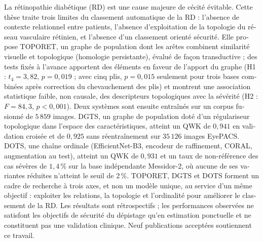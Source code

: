 \documentclass[11pt,a4paper]{article}
\newcommand{\sect}[1]{\par\vspace{5pt}{\color{navy}\bfseries\large #1}\par\vspace{1pt}{\color{navy}\hrule height 0.6pt}\vspace{4pt}}
\begin{document}
\sect{Résumé}
\begin{otherlanguage}{french}
La rétinopathie diabétique (RD) est une cause majeure de cécité évitable. Cette thèse
traite trois limites du classement automatique de la RD : l'absence de contexte
relationnel entre patients, l'absence d'exploitation de la topologie du réseau vasculaire
rétinien, et l'absence d'un classement orienté sécurité. Elle propose TOPORET, un
graphe de population dont les arêtes combinent similarité visuelle et topologique
(homologie persistante), évalué de façon transductive ; des tests fixés à l'avance
apportent des éléments en faveur de l'apport du graphe (H1 : $t_4=3{,}82$, $p=0{,}019$ ;
avec cinq plis, $p=0{,}015$ seulement pour trois bases combinées après correction du
chevauchement des plis) et montrent une association statistique faible, non causale, des
descripteurs topologiques avec la sévérité (H2 : $F=84{,}3$, $p<0{,}001$). Deux systèmes sont ensuite entraînés sur un corpus fusionné
de $5\,859$ images. DGTS, un graphe de population doté d'un régulariseur topologique dans l'espace des caractéristiques,
atteint un QWK de $0{,}941$ en validation croisée et de $0{,}925$ sans réentraînement sur
$35\,126$ images EyePACS. DOTS, une chaîne ordinale (EfficientNet-B3, encodeur de
raffinement, CORAL, augmentation au test), atteint un QWK de $0{,}931$ et un taux de
non-référence des cas sévères de $1{,}4\,\%$ sur la base indépendante Messidor-2, où aucune
de ses variantes réduites n'atteint le seuil de $2\,\%$. TOPORET, DGTS et DOTS forment un cadre de recherche
à trois axes, et non un modèle unique, au service d'un même objectif : exploiter les relations, la topologie et
l'ordinalité pour améliorer le classement de la RD. Les résultats sont rétrospectifs ; les
performances observées ne satisfont les objectifs de sécurité du dépistage qu'en estimation ponctuelle
et ne constituent pas une validation clinique. Neuf publications acceptées soutiennent ce
travail.
\end{otherlanguage}
\end{document}
